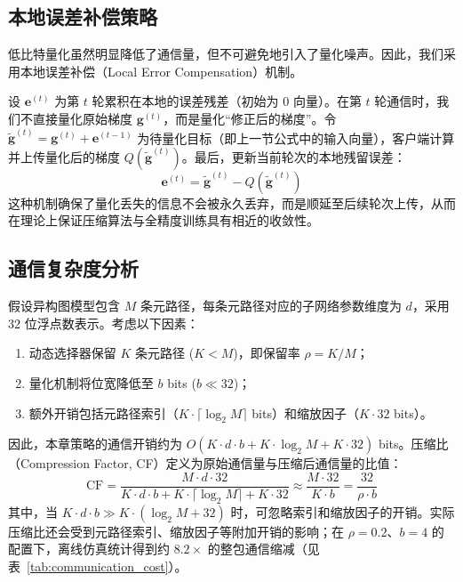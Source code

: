 \subsection{本地误差补偿策略}
\label{subsec:error_compensation}
低比特量化虽然明显降低了通信量，但不可避免地引入了量化噪声。因此，我们采用本地误差补偿（Local Error Compensation）机制\cite{khan2025hufe}。

设 $\mathbf{e}^{(t)}$ 为第 $t$ 轮累积在本地的误差残差（初始为 0 向量）。在第 $t$ 轮通信时，我们不直接量化原始梯度 $\mathbf{g}^{(t)}$，而是量化“修正后的梯度”。令 $\tilde{\mathbf{g}}^{(t)} = \mathbf{g}^{(t)} + \mathbf{e}^{(t-1)}$ 为待量化目标（即上一节公式中的输入向量），客户端计算并上传量化后的梯度 $Q(\tilde{\mathbf{g}}^{(t)})$。最后，更新当前轮次的本地残留误差：
\begin{equation}
    \mathbf{e}^{(t)} = \tilde{\mathbf{g}}^{(t)} - Q(\tilde{\mathbf{g}}^{(t)})
\end{equation}
这种机制确保了量化丢失的信息不会被永久丢弃，而是顺延至后续轮次上传，从而在理论上保证压缩算法与全精度训练具有相近的收敛性。

\subsection{通信复杂度分析}
\label{subsec:complexity_analysis}
假设异构图模型包含 $M$ 条元路径，每条元路径对应的子网络参数维度为 $d$，采用 32 位浮点数表示。考虑以下因素：
\begin{enumerate}[label=\arabic*., labelsep=0.08em, leftmargin=2.1em, labelwidth=1.65em, align=left]
    \item 动态选择器保留 $K$ 条元路径 ($K < M$)，即保留率 $\rho = K/M$；
    \item 量化机制将位宽降低至 $b$ bits ($b \ll 32$)；
    \item 额外开销包括元路径索引（$K \cdot \lceil \log_2 M \rceil$ bits）和缩放因子（$K \cdot 32$ bits）。
\end{enumerate}
因此，本章策略的通信开销约为 $O(K \cdot d \cdot b + K \cdot \log_2 M + K \cdot 32)$ bits。压缩比（Compression Factor, CF）定义为原始通信量与压缩后通信量的比值：
\begin{equation}
    \text{CF} = \frac{M \cdot d \cdot 32}{K \cdot d \cdot b + K \cdot \lceil \log_2 M \rceil + K \cdot 32} \approx \frac{M \cdot 32}{K \cdot b} = \frac{32}{\rho \cdot b}
    \label{eq:compression_factor}
\end{equation}
其中，当 $K \cdot d \cdot b \gg K \cdot (\log_2 M + 32)$ 时，可忽略索引和缩放因子的开销。实际压缩比还会受到元路径索引、缩放因子等附加开销的影响；在 $\rho=0.2$、$b=4$ 的配置下，离线仿真统计得到约 $8.2\times$ 的整包通信缩减（见表~\ref{tab:communication_cost}）。

